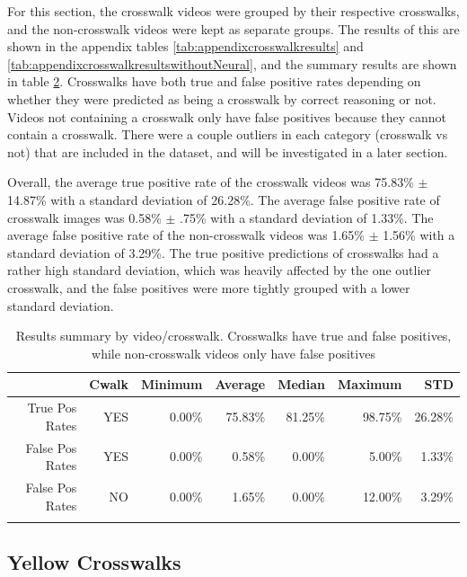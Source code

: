 \documentclass[12pt]{ucthesis}
\begin{document}
For this section, the crosswalk videos were grouped by their respective crosswalks, and the non-crosswalk videos were kept as separate groups. The results of this are shown in the appendix tables \ref{tab:appendixcrosswalkresults} and \ref{tab:appendixcrosswalkresultswithoutNeural}, and the summary results are shown in table \ref{tab:crosswalkResultsSummary}. Crosswalks have both true and false positive rates depending on whether they were predicted as being a crosswalk by correct reasoning or not. Videos not containing a crosswalk only have false positives because they cannot contain a crosswalk.  There were a couple outliers in each category (crosswalk vs not) that are included in the dataset, and will be investigated in a later section.

Overall, the average true positive rate of the crosswalk videos was 75.83\% $\pm$ 14.87\% with a standard deviation of 26.28\%. The average false positive rate of crosswalk images was 0.58\% $\pm$ .75\% with a standard deviation of 1.33\%. The average false positive rate of the non-crosswalk videos was 1.65\% $\pm$ 1.56\% with a standard deviation of 3.29\%.
The true positive predictions of crosswalks had a rather high standard deviation, which was heavily affected by the one outlier crosswalk, and the false positives were more tightly grouped with a lower standard deviation.

\begin{table}[t]
    \begin{longtable}{|r|r|r|r|r|r|r|}
    \hline
       & Cwalk & Minimum & Average & Median & Maximum & STD \bigstrut\\
    \hline
    True Pos Rates & YES & 0.00\% & 75.83\% & 81.25\% & 98.75\% & 26.28\% \bigstrut\\
    \hline
    False Pos Rates & YES & 0.00\% & 0.58\% & 0.00\% & 5.00\% & 1.33\% \bigstrut\\
    \hline
    False Pos Rates & NO & 0.00\% & 1.65\% & 0.00\% & 12.00\% & 3.29\% \bigstrut\\
    \hline

    \caption[Results summary by video/crosswalk]{Results summary by video/crosswalk. Crosswalks have true and false positives, while non-crosswalk videos only have false positives}
    \label{tab:crosswalkResultsSummary} 
    \end{longtable}
\end{table}



\subsection{Yellow Crosswalks}
\end{document}
